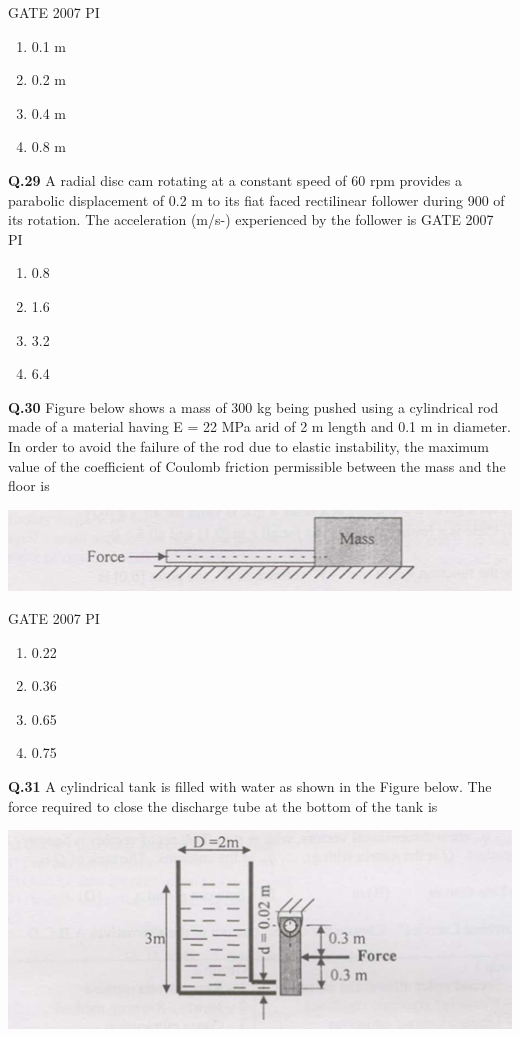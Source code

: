 \documentclass[journal,12pt,onecolumn]{exam}
\theoremstyle{remark}
\begin{document}
                \hfill{GATE 2007 PI}
                \begin{enumerate}
                    \item 0.1 m
                    \item 0.2 m
                    \item 0.4 m
                    \item 0.8 m
                    \end{enumerate}
                    \noindent
                    \textbf{Q.29}
                    A radial disc cam rotating at a constant speed of 60 rpm provides a parabolic displacement of 0.2 m to its fiat faced rectilinear follower during 900 of its rotation. The acceleration (m/s-) experienced by the follower is
                    \hfill{GATE 2007 PI}
                    \begin{enumerate}
                        \item 0.8
                        \item 1.6
                        \item 3.2
                        \item 6.4
                    \end{enumerate}
                    \noindent
                    \textbf{Q.30}
                    Figure below shows a mass of 300 kg being pushed using a cylindrical rod made of a material having E = 22 MPa arid of 2 m length and 0.1 m in diameter. In order to avoid the failure of the rod due to elastic instability, the maximum value of the coefficient of Coulomb friction permissible between the mass and the floor is

    \includegraphics[width=0.4\linewidth]{figs/Q.30.png}
   
                   \hfill{GATE 2007 PI}
\begin{enumerate}
    \item 0.22
    \item 0.36
    \item 0.65
    \item 0.75
\end{enumerate}
\noindent
\textbf{Q.31}
A cylindrical tank is filled with water as shown in the Figure below. The force required to close the discharge tube at the bottom of the tank is

\includegraphics[width=0.5\linewidth]{figs/Q.31.png}
\end{document}
